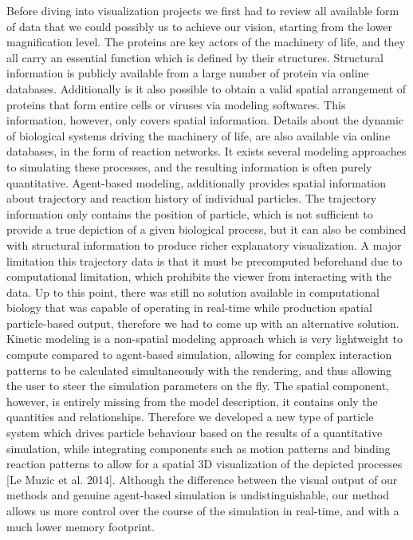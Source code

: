 Before diving into visualization projects we first had to review all available form of data that we could possibly us to achieve our vision, starting from the lower magnification level.
The proteins are key actors of the machinery of life, and they all carry an essential function which is defined by their structures.
Structural information is publicly available from a large number of protein via online databases.
Additionally is it also possible to obtain a valid spatial arrangement of proteins that form entire cells or viruses via modeling softwares.
This information, however, only covers spatial information.
Details about the dynamic of biological systems driving the machinery of life, are also available via online databases, in the form of reaction networks.
It exists several modeling approaches to simulating these processes, and the resulting information is often purely quantitative.
Agent-based modeling, additionally provides spatial information about trajectory and reaction history of individual particles.
The trajectory information only contains the position of particle, which is not sufficient to provide a true depiction of a given biological process, but it can also be combined with structural information to produce richer explanatory visualization.
A major limitation this trajectory data is that it must be precomputed beforehand due to computational limitation, which prohibits the viewer from interacting with the data.
Up to this point, there was still no solution available in computational biology that was capable of operating in real-time while production spatial particle-based output, therefore we had to come up with an alternative solution.
Kinetic modeling is a non-spatial modeling approach which is very lightweight to compute compared to agent-based simulation, allowing for complex interaction patterns to be calculated simultaneously with the rendering, and thus allowing the user to steer the simulation parameters on the fly.
The spatial component, however, is entirely missing from the model description, it contains only the quantities and relationships.
Therefore we developed a new type of particle system which drives particle behaviour based on the results of a quantitative simulation, while integrating components such as motion patterns and binding reaction patterns to allow for a spatial 3D visualization of the depicted processes [Le Muzic et al. 2014].
Although the difference between the visual output of our methods and genuine agent-based simulation is undistinguishable, our method allows us more control over the course of the simulation in real-time, and with a much lower memory footprint.

